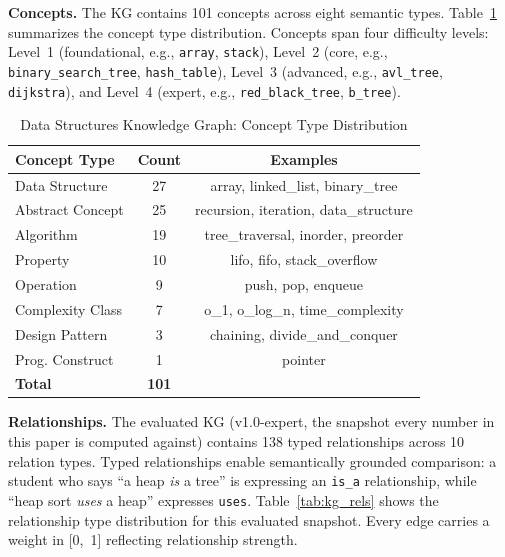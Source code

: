 \documentclass[conference]{IEEEtran}
\begin{document}
\textbf{Concepts.} The KG contains 101 concepts across eight semantic types.
Table~\ref{tab:kg_concepts} summarizes the concept type distribution. Concepts
span four difficulty levels: Level~1 (foundational, e.g., \texttt{array},
\texttt{stack}), Level~2 (core, e.g., \texttt{binary\_search\_tree},
\texttt{hash\_table}), Level~3 (advanced, e.g., \texttt{avl\_tree},
\texttt{dijkstra}), and Level~4 (expert, e.g., \texttt{red\_black\_tree},
\texttt{b\_tree}).

\begin{table}[t]
\caption{Data Structures Knowledge Graph: Concept Type Distribution}
\label{tab:kg_concepts}
\centering
\begin{tabular}{lcc}
\toprule
\textbf{Concept Type} & \textbf{Count} & \textbf{Examples} \\
\midrule
Data Structure     & 27 & array, linked\_list, binary\_tree \\
Abstract Concept   & 25 & recursion, iteration, data\_structure \\
Algorithm          & 19 & tree\_traversal, inorder, preorder \\
Property           & 10 & lifo, fifo, stack\_overflow \\
Operation          &  9 & push, pop, enqueue \\
Complexity Class   &  7 & o\_1, o\_log\_n, time\_complexity \\
Design Pattern     &  3 & chaining, divide\_and\_conquer \\
Prog. Construct    &  1 & pointer \\
\midrule
\textbf{Total}     & \textbf{101} & \\
\bottomrule
\end{tabular}
\end{table}

\textbf{Relationships.} The evaluated KG (v1.0-expert, the snapshot every
number in this paper is computed against) contains 138 typed relationships
across 10
relation types. Typed relationships enable semantically grounded comparison: a
student who says ``a heap \emph{is} a tree'' is expressing an \texttt{is\_a}
relationship, while ``heap sort \emph{uses} a heap'' expresses \texttt{uses}.
Table~\ref{tab:kg_rels} shows the relationship type distribution for this
evaluated snapshot. Every edge carries
a weight in [0,~1] reflecting relationship strength.
\end{document}
